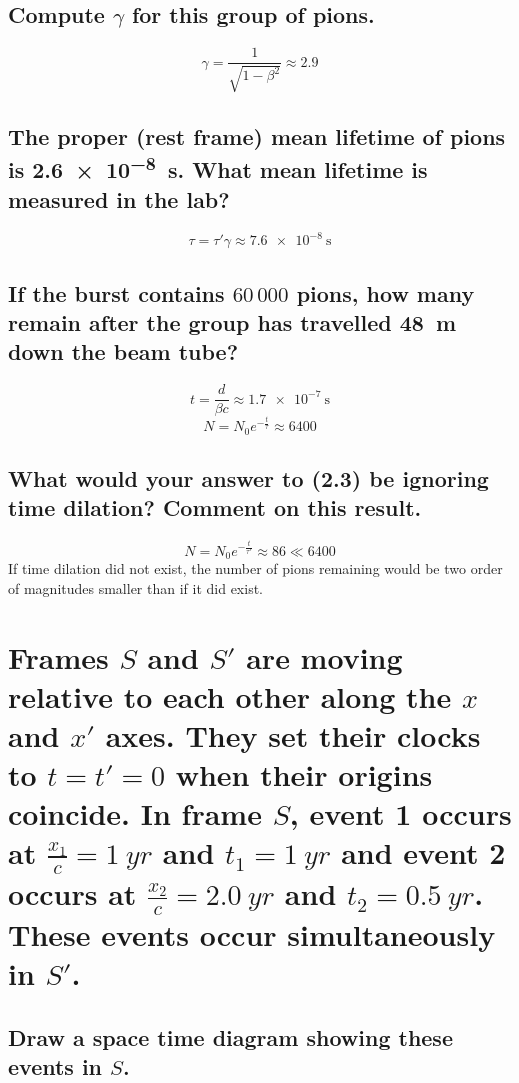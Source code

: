 \documentclass[a4paper]{scrartcl}
\begin{document}
\subsection{Compute \(\gamma\) for this group of pions.}
\[\gamma = \frac{1}{\sqrt{1 - \beta^2}} \approx 2.9\]

\subsection{The proper (rest frame) mean lifetime of pions is \SI{2.6e-8}{\second}. What mean lifetime is measured in the lab?}
\[\tau = \tau' \gamma \approx \SI{7.6e-8}{\second}\]

\subsection{If the burst contains \(60\,000\) pions, how many remain after the group has travelled \SI{48}{\metre} down the beam tube?}
\[t = \frac{d}{\beta c} \approx \SI{1.7e-7}{\second}\]
\[N = N_0 e^{-\frac{t}{\tau}} \approx 6400\]

\subsection{What would your answer to (2.3) be ignoring time dilation? Comment on this result.}
\[N = N_0 e^{-\frac{t}{\tau'}} \approx 86 \ll 6400\]
If time dilation did not exist, the number of pions remaining would be two order of magnitudes smaller than if it did exist.

\section{Frames \(S\) and \(S'\) are moving relative to each other along the \(x\) and \(x'\) axes. They set their clocks to \(t = t' = 0\) when their origins coincide. In frame \(S\), event 1 occurs at \(\frac{x_1}{c} = \SI{1}{yr}\) and \(t_1 = \SI{1}{yr}\) and event 2 occurs at \(\frac{x_2}{c} = \SI{2.0}{yr}\) and \(t_2 = \SI{0.5}{yr}\). These events occur simultaneously in \(S'\).}
\subsection{Draw a space time diagram showing these events in \(S\).}
\begin{figure}[H]
    \centering
\end{figure}
\end{document}
